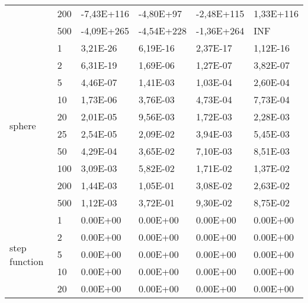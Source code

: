 \begin{longtable}[c]{|m{3.5cm}|l|l|l|l|l|}
                                        & 200       & -7,43E+116 & -4,80E+97  & -2,48E+115 & 1,33E+116 \\ \cline{2-6} 
                                        & 500       & -4,09E+265 & -4,54E+228 & -1,36E+264 & INF       \\ \hline
\multirow{10}{*}{sphere}                & 1         & 3,21E-26   & 6,19E-16   & 2,37E-17   & 1,12E-16  \\ \cline{2-6} 
                                        & 2         & 6,31E-19   & 1,69E-06   & 1,27E-07   & 3,82E-07  \\ \cline{2-6} 
                                        & 5         & 4,46E-07   & 1,41E-03   & 1,03E-04   & 2,60E-04  \\ \cline{2-6} 
                                        & 10        & 1,73E-06   & 3,76E-03   & 4,73E-04   & 7,73E-04  \\ \cline{2-6} 
                                        & 20        & 2,01E-05   & 9,56E-03   & 1,72E-03   & 2,28E-03  \\ \cline{2-6} 
                                        & 25        & 2,54E-05   & 2,09E-02   & 3,94E-03   & 5,45E-03  \\ \cline{2-6} 
                                        & 50        & 4,29E-04   & 3,65E-02   & 7,10E-03   & 8,51E-03  \\ \cline{2-6} 
                                        & 100       & 3,09E-03   & 5,82E-02   & 1,71E-02   & 1,37E-02  \\ \cline{2-6} 
                                        & 200       & 1,44E-03   & 1,05E-01   & 3,08E-02   & 2,63E-02  \\ \cline{2-6} 
                                        & 500       & 1,12E-03   & 3,72E-01   & 9,30E-02   & 8,75E-02  \\ \hline
\multirow{10}{*}{step function}         & 1         & 0.00E+00   & 0.00E+00   & 0.00E+00   & 0.00E+00  \\ \cline{2-6} 
                                        & 2         & 0.00E+00   & 0.00E+00   & 0.00E+00   & 0.00E+00  \\ \cline{2-6} 
                                        & 5         & 0.00E+00   & 0.00E+00   & 0.00E+00   & 0.00E+00  \\ \cline{2-6} 
                                        & 10        & 0.00E+00   & 0.00E+00   & 0.00E+00   & 0.00E+00  \\ \cline{2-6} 
                                        & 20        & 0.00E+00   & 0.00E+00   & 0.00E+00   & 0.00E+00  \\ \cline{2-6} 

\end{longtable}
